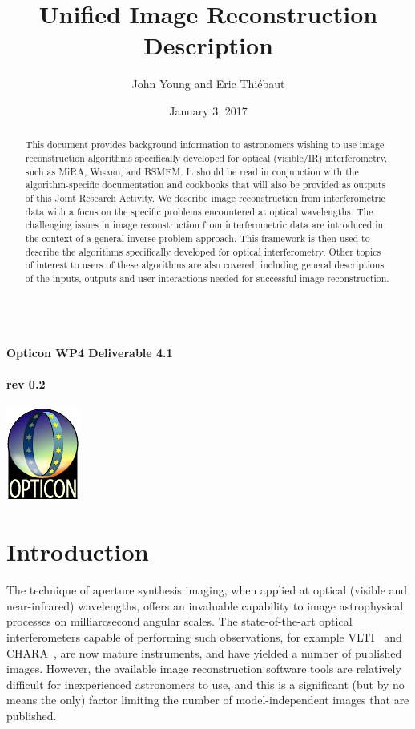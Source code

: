 \documentclass{article}
\newcommand{\identifier}[1]{\def\theidentifier{#1}}
\newcommand{\revision}[1]{\def\therevision{#1}}
\newcommand{\opttitlepage}{
\begin{titlepage}
\thispagestyle{plain}
\begin{center}
%
\vspace*{18mm}
{\bfseries\sffamily
  \Large\thetitle \\
  \vspace{6mm}
  \large\theidentifier \\ }
%
\vspace{17mm}
{\large\bfseries\sffamily \theauthor \\ }
%
\vspace{24mm}
{\large\bfseries\sffamily
  rev \therevision \\
  \vspace{6mm}
  \thedate \\ }
%
\vspace{36mm}
\includegraphics{opt_col_sm} \\
%
\end{center}
\end{titlepage}
}
\newcommand{\Mira}{MiRA\xspace}
\newcommand{\BSMEM}{BSMEM\xspace}
\newcommand{\Wisard}{\textsc{Wisard}\xspace}
\begin{document}
\title{Unified Image Reconstruction Description}

\author{John Young and Eric Thi\'ebaut}


\identifier{Opticon WP4 Deliverable 4.1}
\revision{0.2}
\date{January 3, 2017}

\opttitlepage

\begin{abstract}
  This document provides background information to astronomers
  wishing to use image reconstruction algorithms specifically developed for
  optical (visible/IR) interferometry, such as \Mira, \Wisard, and \BSMEM. It
  should be read in conjunction with the algorithm-specific documentation and
  cookbooks that will also be provided as outputs of this Joint Research
  Activity. We describe image reconstruction from interferometric data with a
  focus on the specific problems encountered at optical wavelengths.  The
  challenging issues in image reconstruction from interferometric data are
  introduced in the context of a general inverse problem approach.  This
  framework is then used to describe the algorithms specifically developed for
  optical interferometry. Other topics of interest to users of these
  algorithms are also covered, including general descriptions of the inputs,
  outputs and user interactions needed for successful image reconstruction.
\end{abstract}

\section{Introduction}

The technique of aperture synthesis imaging, when applied at optical (visible
and near-infrared) wavelengths, offers an invaluable capability to image
astrophysical processes on milliarcsecond angular scales. The state-of-the-art
optical interferometers capable of performing such observations, for example
VLTI~\citep{Glindemann_et_al-2000-VLTI} and
CHARA~\citep{tenBrummelaar_et_al-2005-CHARA}, are now mature instruments, and
have yielded a number of published images. However, the available image
reconstruction software tools are relatively difficult for inexperienced
astronomers to use, and this is a significant (but by no means the only)
factor limiting the number of model-independent images that are published.
\end{document}
